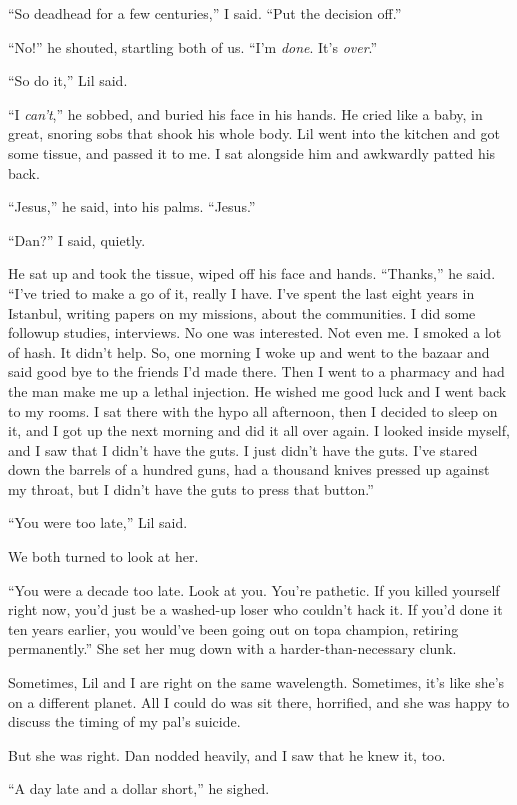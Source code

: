 “So deadhead for a few centuries,” I said. “Put the decision off.”

“No!” he shouted, startling both of us. “I'm \emph{done}. It's
\emph{over}.”

“So do it,” Lil said.

“I \emph{can't},” he sobbed, and buried his face in his hands. He
cried like a baby, in great, snoring sobs that shook his whole
body. Lil went into the kitchen and got some tissue, and passed it
to me. I sat alongside him and awkwardly patted his back.

“Jesus,” he said, into his palms. “Jesus.”

“Dan?” I said, quietly.

He sat up and took the tissue, wiped off his face and hands.
“Thanks,” he said. “I've tried to make a go of it, really I have.
I've spent the last eight years in Istanbul, writing papers on my
missions, about the communities. I did some followup studies,
interviews. No one was interested. Not even me. I smoked a lot of
hash. It didn't help. So, one morning I woke up and went to the
bazaar and said good bye to the friends I'd made there. Then I went
to a pharmacy and had the man make me up a lethal injection. He
wished me good luck and I went back to my rooms. I sat there with
the hypo all afternoon, then I decided to sleep on it, and I got up
the next morning and did it all over again. I looked inside myself,
and I saw that I didn't have the guts. I just didn't have the guts.
I've stared down the barrels of a hundred guns, had a thousand
knives pressed up against my throat, but I didn't have the guts to
press that button.”

“You were too late,” Lil said.

We both turned to look at her.

“You were a decade too late. Look at you. You're pathetic. If you
killed yourself right now, you'd just be a washed-up loser who
couldn't hack it. If you'd done it ten years earlier, you would've
been going out on top{\dash}a champion, retiring permanently.” She set
her mug down with a harder-than-necessary clunk.

Sometimes, Lil and I are right on the same wavelength. Sometimes,
it's like she's on a different planet. All I could do was sit
there, horrified, and she was happy to discuss the timing of my
pal's suicide.

But she was right. Dan nodded heavily, and I saw that he knew it,
too.

“A day late and a dollar short,” he sighed.

